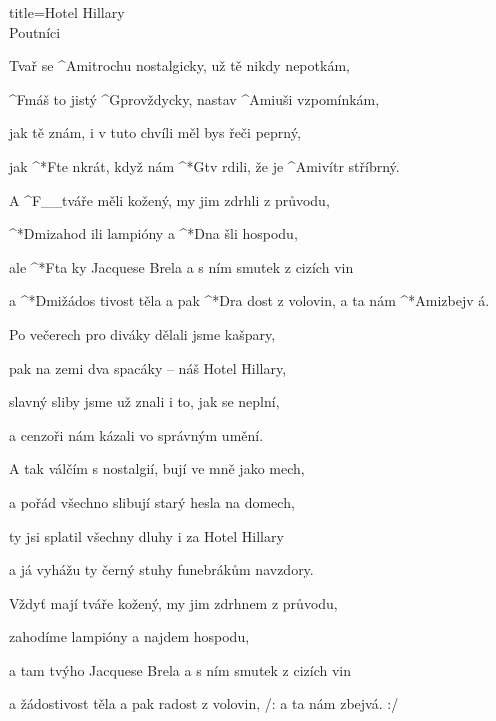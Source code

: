 \begin{song}{title=\predtitle\centering Hotel Hillary \\\large Poutníci \vspace*{-0.3cm}}  %
\begin{centerjustified}
\nejnejvetsi

\sloka 
	Tvař se ^{Ami}trochu nostalgicky, už tě nikdy nepotkám,

	^{F}máš to jistý ^{G}provždycky, nastav ^{Ami}uši vzpomínkám,

	jak tě znám, i v tuto chvíli měl bys řeči peprný,
    
	jak ^*{F}te nkrát, když nám ^*{G}tv rdili, že je ^{Ami}vítr stříbrný.


	A ^{F{\color{white}\_\_}}tváře měli kožený, my jim zdrhli z průvodu,

	^*{Dmi}zahod ili lampióny a ^*{D}na šli hospodu,

	ale ^*{F}ta ky Jacquese Brela a s ním smutek z cizích vin

	a ^*{Dmi}žádos tivost těla a pak ^*{D}ra dost z volovin, a ta nám ^*{Ami}zbejv á.

\sloka
	Po večerech pro diváky dělali jsme kašpary,
	
	pak na zemi dva spacáky -- náš Hotel Hillary,
	
	slavný sliby jsme už znali i to, jak se neplní,
	
	a cenzoři nám kázali vo správným umění.


\sloka	
	A tak válčím s nostalgií, bují ve mně jako mech,
	
	a pořád všechno slibují starý hesla na domech,
	
	ty jsi splatil všechny dluhy i za Hotel Hillary
	
	a já vyhážu ty černý stuhy funebrákům navzdory.

	Vždyť mají tváře kožený, my jim zdrhnem z průvodu,
	
	zahodíme lampióny a najdem hospodu,
	
	a tam tvýho Jacquese Brela a s ním smutek z cizích vin
	
	a žádostivost těla a pak radost z volovin, /: a ta nám zbejvá. :/


\end{centerjustified}
\setcounter{Slokočet}{0}
\end{song}
